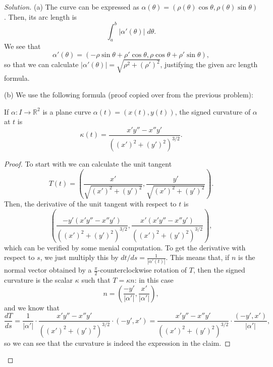 \documentclass[11pt]{scrartcl}
\providecommand{\RR}{\mathbb R}
\providecommand{\dif}{\;d}
\newenvironment{soln}{\begin{proof}[Solution]}{\end{proof}}
\begin{document}
\begin{soln}
	(a) The curve can be expressed as
	$\alpha(\theta) = (\rho(\theta)\cos\theta, \rho(\theta)\sin\theta)$.
	Then, its arc length is
	\[\int_a^b |\alpha'(\theta)|\dif\theta.\]
	We see that
	\[\alpha'(\theta) = (-\rho\sin\theta + \rho'\cos\theta,
	\rho\cos\theta + \rho'\sin\theta),\]
	so that we can calculate $|\alpha'(\theta)| = \sqrt{\rho^2 + (\rho')^2}$,
	justifying the given arc length formula.
	
	(b) We use the following formula
	(proof copied over from the previous problem):
	\begin{claim*}[Problem 1.5.12(d)]
		If $\alpha\colon I\to\RR^2$ is a plane curve
		$\alpha(t) = (x(t), y(t))$, the signed curvature of $\alpha$ at $t$ is
		\[\kappa(t) = \frac{x'y'' - x''y'}{((x')^2 + (y')^2)^{3/2}}.\]
	\end{claim*}
	\begin{proof}
		To start with we can calculate the unit tangent
		\[T(t) = \left(\frac{x'}{\sqrt{(x')^2 + (y')^2}},
		\frac{y'}{\sqrt{(x')^2 + (y')^2}}\right).\]
		Then, the derivative of the unit tangent with respect to $t$ is
		\[\left(\frac{-y'(x'y'' - x''y')}{((x')^2 + (y')^2)^{3/2}},
		\frac{x'(x'y'' - x''y')}{((x')^2 + (y')^2)^{3/2}}\right),\]
		which can be verified by some menial computation.
		To get the derivative with respect to $s$, we just multiply this by
		$dt/ds = \frac1{|\alpha'(t)|}$. This means that,
		if $n$ is the normal vector obtained by a $\frac\pi2$-counterclockwise
		rotation of $T$, then the signed curvature is the scalar $\kappa$
		such that $T = \kappa n$: in this case
		\[n = \left(\frac{-y'}{|\alpha'|}, \frac{x'}{|\alpha'|}\right),\]
		and we know that
		\[\frac{dT}{ds} = \frac{1}{|\alpha'|}\cdot
		\frac{x'y'' - x''y'}{((x')^2 + (y')^2)^{3/2}}\cdot(-y',x') =
		\frac{x'y'' - x''y'}{((x')^2 + (y')^2)^{3/2}}\cdot
		\frac{(-y', x')}{|\alpha'|},\]
		so we can see that the curvature is indeed
		the expression in the claim.
	\end{proof}


\end{soln}
\end{document}
